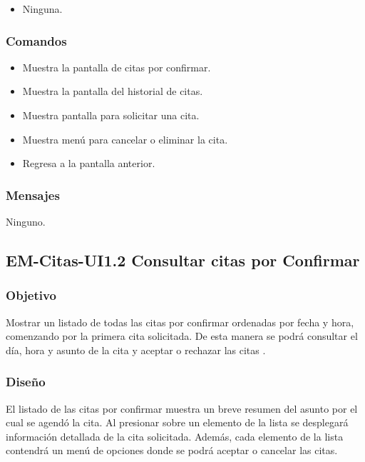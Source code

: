 \begin{itemize}
	\item Ninguna.
\end{itemize}

\subsubsection{Comandos}
\begin{itemize}
	\item {} Muestra la pantalla de citas por confirmar.
	\item {} Muestra la pantalla del historial de citas.
	\item {} Muestra pantalla para solicitar una cita.
	\item {} Muestra menú para cancelar o eliminar la cita.
	\item {} Regresa a la pantalla anterior.
\end{itemize}

\subsubsection{Mensajes}
\begin{Citemize}
	\item Ninguno.
\end{Citemize}

\pagebreak

\subsection{EM-Citas-UI1.2 Consultar citas por Confirmar}

\subsubsection{Objetivo}
	\noindent
	Mostrar un listado de todas las citas por confirmar ordenadas por fecha y hora, comenzando por la primera cita solicitada. De esta manera se podrá consultar el día, hora y asunto de la cita y aceptar o rechazar las citas .

\subsubsection{Diseño}
	\noindent
	El listado de las citas por confirmar muestra un breve resumen del asunto por el cual se agendó la cita.
	Al presionar sobre un elemento de la lista se desplegará información detallada de 
	la cita solicitada. Además, cada elemento de la lista contendrá un menú de opciones donde se podrá aceptar o cancelar las citas.

